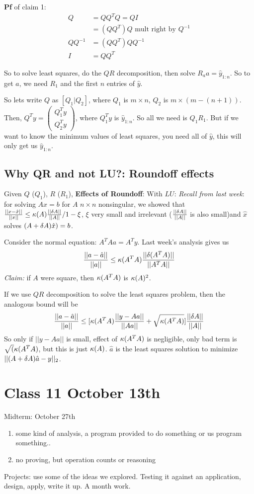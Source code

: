 \textbf{Pf} of claim 1:
\begin{align*}
  Q&=QQ^TQ= QI\\
&=(QQ^T)Q \text{ mult right by }Q^{-1}\\
QQ^{-1}&= (QQ^T)QQ^{-1}\\
I &= QQ^T
\end{align*}

So to solve least squares, do the $QR$ decomposition, then solve
$R_aa=\hat y_{1:n}$. So to get $a$, we need $R_1$ and the first $n$ entries
of $\hat y$.

So lets write $Q$ as $[Q_1 | Q_2]$, where $Q_1$ is $m\times n$, $Q_2$
is $m \times (m-(n+1))$. Then, $Q^Ty =
\begin{pmatrix}
  Q_1^Ty\\
Q^T_2y
\end{pmatrix}$, where $Q_1^Ty$ is $\hat y_{1:n}$. So all we need is
$Q_1R_1$. But if we want to know the minimum values of least squares,
you need all of $\hat y$, this will only get us $\hat y_{1:n}$.

\subsection{Why QR and not LU?: Roundoff effects}
\label{sec:roundoff}
Given $Q$ ($Q_1$), $R$ ($R_1$), \textbf{Effects of Roundoff}:
With $LU$:
\emph{Recall from last week}: for solving $Ax=b$ for $A$ $n\times n$ nonsingular, we
showed that $\frac{||x-\hat x||}{||x||} \le \kappa(A)\frac{||\delta
  A||}{||A||}/ 1-\xi$, $\xi$ very small and irrelevant ($\frac{||\delta
  A||}{||A||}$ is also small)and $\hat x$ solves
$(A+\delta A)\hat x) = b$.


Consider the normal equation: $A^TAa = A^Ty$. Last week's analysis
gives us $$\frac{||a-\hat a||}{||a||}\le \kappa(A^TA)\frac{||\delta
  (A^TA)||}{||A^TA||}$$
\emph{Claim:} if $A$ were square, then $\kappa(A^TA)$ is $\kappa(A)^2$.

If we use $QR$ decomposition to solve the least squares problem, then
the analogous bound will be
$$\frac{||a-\hat a||}{||a||}\le [\kappa(A^TA)\frac{||y-Aa||}{||Aa||} +
\sqrt{\kappa(A^TA)}]\frac{||\delta A||}{||A||}$$
So only if $||y-Aa||$ is small, effect of $\kappa(A^TA)$ is negligible,
only bad term is $\sqrt({\kappa(A^TA)}$, but this is just
$\kappa(A)$. $\hat a$ is the least squares solution to minimize
$||(A+\delta A)\hat a - y||_2$.
\pagebreak

\section{Class 11 October 13th}
\label{sec:class11}
Midterm: October 27th
\begin{enumerate}
\item some kind of analysis, a program provided to do something or us
  program something..
\item no proving, but operation counts or reasoning
\end{enumerate}
Projects: use some of the ideas we explored. Testing it against an
application, design, apply, write it up. A month work.

